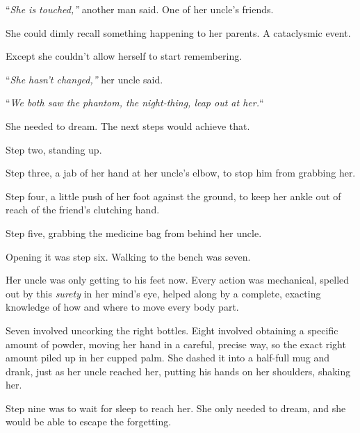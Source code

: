 ``\emph{She is touched,'' }another man said.  One of her uncle's friends.



She could dimly recall something happening to her parents.  A cataclysmic event.



Except she couldn't allow herself to start remembering.



``\emph{She hasn't changed,'' }her uncle said.



``\emph{We both saw the phantom, the night-thing, leap out at her.}``



She needed to dream.  The next steps would achieve that.



Step two, standing up.



Step three, a jab of her hand at her uncle's elbow, to stop him from grabbing her.



Step four, a little push of her foot against the ground, to keep her ankle out of reach of the friend's clutching hand.



Step five, grabbing the medicine bag from behind her uncle.



Opening it was step six.  Walking to the bench was seven.



Her uncle was only getting to his feet now.  Every action was mechanical, spelled out by this \emph{surety} in her mind's eye, helped along by a complete, exacting knowledge of how and where to move every body part.



Seven involved uncorking the right bottles.  Eight involved obtaining a specific amount of powder, moving her hand in a careful, precise way, so the exact right amount piled up in her cupped palm.  She dashed it into a half-full mug and drank, just as her uncle reached her, putting his hands on her shoulders, shaking her.



Step nine was to wait for sleep to reach her.  She only needed to dream, and she would be able to escape the forgetting.



\blacksquare



